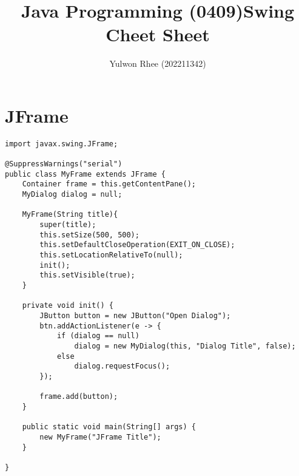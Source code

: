 



\title{Java Programming (0409)\newline\space Swing Cheet Sheet}
\author{Yulwon Rhee (202211342)}

\maketitle
\section{JFrame}
\begin{verbatim}
import javax.swing.JFrame;

@SuppressWarnings("serial")
public class MyFrame extends JFrame {
    Container frame = this.getContentPane();
    MyDialog dialog = null;

    MyFrame(String title){
        super(title);
        this.setSize(500, 500);
        this.setDefaultCloseOperation(EXIT_ON_CLOSE);
        this.setLocationRelativeTo(null);
        init();
        this.setVisible(true);
    }

    private void init() {
        JButton button = new JButton("Open Dialog");
        btn.addActionListener(e -> {
            if (dialog == null)
                dialog = new MyDialog(this, "Dialog Title", false);
            else
                dialog.requestFocus();
        });

        frame.add(button);
    }

    public static void main(String[] args) {
        new MyFrame("JFrame Title");
    }

}
\end{verbatim}

